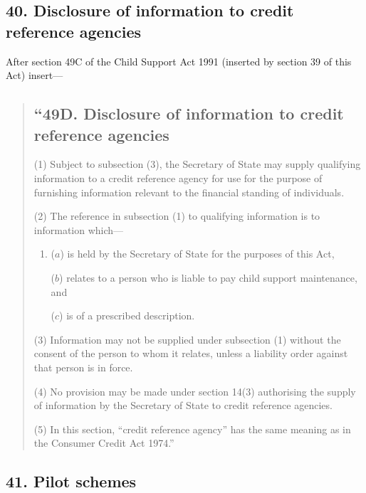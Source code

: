 \documentclass[12pt,a4paper]{article}
\begin{document}

\subsection{40. Disclosure of information to credit reference agencies}

After section 49C of the Child Support Act 1991 (inserted by section 39 of this Act) insert—
\begin{quotation}
\subsection*{“49D. Disclosure of information to credit reference agencies}

(1) Subject to subsection (3), the 
Secretary of State  %
may supply qualifying information to a credit reference agency for use for the purpose of furnishing information relevant to the financial standing of individuals.

(2) The reference in subsection (1) to qualifying information is to information which—
\begin{enumerate}\item[]
($a$) is held by the 
Secretary of State  %
for the purposes of this Act,

($b$) relates to a person who is liable to pay child support maintenance, and

($c$) is of a prescribed description.
\end{enumerate}

(3) Information may not be supplied under subsection (1) without the consent of the person to whom it relates, unless a liability order against that person is in force.

(4) No provision may be made under section 14(3) authorising the supply of information by the 
Secretary of State  %
to credit reference agencies.

(5) In this section, “credit reference agency” has the same meaning as in the Consumer Credit Act 1974.”
\end{quotation}

\subsection{41. Pilot schemes}
\end{document}
